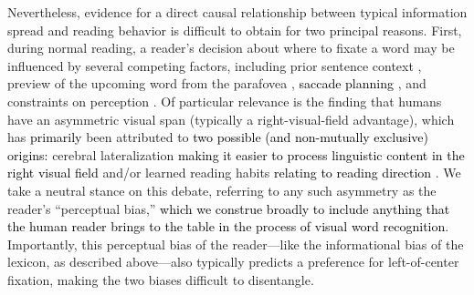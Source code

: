\documentclass[doc,biblatex]{apa7}
\newcommand\newmaterial[1]{\textcolor{black}{#1}}
\begin{document}
Nevertheless, evidence for a direct causal relationship between typical information spread and reading behavior is difficult to obtain for two principal reasons. First, during normal reading, a reader's decision about where to fixate a word may be influenced by several competing factors, including prior sentence context \parencite{Balota:1985}, preview of the upcoming word from the parafovea \parencite{Hyona:1989, Underwood:1990, Schotter:2011}, \newmaterial{saccade planning \parencite{Engbert:2010, Krugel:2014, McDonald:2004}}, and constraints on perception \parencite{Bouma:1973, McConkie:1975}. Of particular relevance is the finding that humans have an asymmetric visual span (typically a right-visual-field advantage), which has \newmaterial{primarily} been attributed to \newmaterial{two possible (and non-mutually exclusive) origins:} cerebral lateralization \newmaterial{making it easier to process linguistic content in the right visual field} \parencite{Brysbaert:1988, Bub:1988, Ellis:2004, VanderHaegen:2013} and/or learned reading habits \newmaterial{relating to reading direction} \parencite{Huey:1900, Mishkin:1952, Pollatsek:1981}. We take a neutral stance on this debate, referring to any such asymmetry as the reader's ``perceptual bias,'' \newmaterial{which we construe broadly to include anything that the human reader brings to the table in the process of visual word recognition}. Importantly, this perceptual bias of the reader---like the informational bias of the lexicon, as described above---also typically predicts a preference for left-of-center fixation, making the two biases difficult to disentangle.
\end{document}
